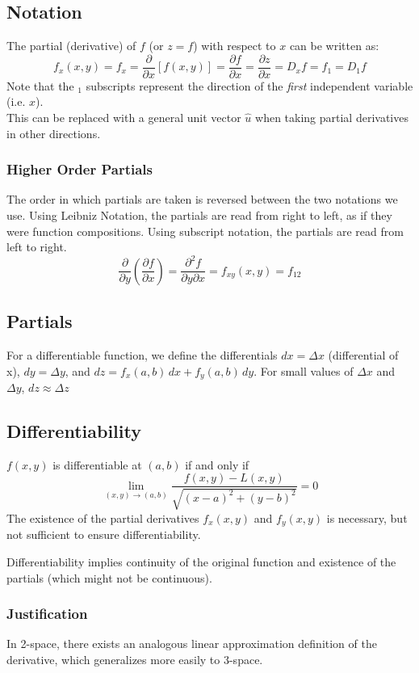 \documentclass{article}
\begin{document}
\subsection{Notation}
The partial (derivative) of $f$ (or $z=f$) with respect to $x$ can be written as:
\[
f_x(x,y)=f_x=\frac{\partial}{\partial x}\left[f(x,y)\right] = \frac{\partial f}{\partial x} = \frac{\partial z}{\partial x}=D_xf=f_1=D_1f
\]
Note that the $_1$ subscripts represent the direction of the \emph{first} independent variable (i.e. $x$).\\
This can be replaced with a general unit vector $\hat{u}$ when taking partial derivatives in other directions.

\subsubsection{Higher Order Partials}
The order in which partials are taken is reversed between the two notations we use. Using Leibniz Notation, the partials are read from right to left, as if they were function compositions. Using subscript notation, the partials are read from left to right.
\[
    \frac{\partial}{\partial y} \left(\frac{\partial f}{\partial x}\right) = \frac{\partial^2f}{\partial y \partial x} = f_{xy}(x,y) = f_{12}
\]

\subsection{Partials}
For a differentiable function, we define the differentials $dx=\Delta x$ (differential of x), $dy=\Delta y$, and $dz = f_x(a,b)\,dx + f_y(a,b)\,dy$. For small values of $\Delta x$ and $\Delta y$, $dz\approx\Delta z$

\subsection{Differentiability}
$f(x,y)$ is differentiable at $(a,b)$ if and only if
\[
	\lim_{(x,y)\to(a,b)} \frac{f(x,y) - L(x,y)}{\sqrt{(x-a)^2 + (y-b)^2}} = 0
\]
The existence of the partial derivatives $f_x(x,y)$ and $f_y(x,y)$ is necessary, but not sufficient to ensure differentiability.

Differentiability implies continuity of the original function and existence of the partials (which might not be continuous).

\subsubsection{Justification}
In 2-space, there exists an analogous linear approximation definition of the derivative, which generalizes more easily to 3-space.
\end{document}
